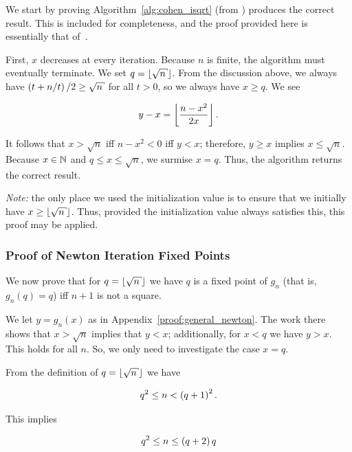 We start by proving Algorithm~\ref{alg:cohen_isqrt}
(from \cite[Algorithm 1.7.1]{cohen1993})
produces the correct result.
This is included for completeness,
and the proof provided here is essentially that
of~\cite[Algorithm 1.7.1, Proof]{cohen1993}.

First, $x$ decreases at every iteration.
Because $n$ is finite, the algorithm must eventually terminate.
We set $q = \floor{\sqrt{n}}$.
From the discussion above, we always have $\parens{t + n/t}/2 \ge \sqrt{n}$
for all $t > 0$,
so we always have $x\ge q$.
We see

\begin{equation}
    y - x = \left\lfloor \frac{n - x^{2}}{2x} \right\rfloor.
\end{equation}

\noindent
It follows that $x > \sqrt{n}$ iff $n - x^{2} < 0$ iff $y < x$;
therefore, $y\ge x$ implies $x \le \sqrt{n}$.
Because $x\in\mathbb{N}$ and $q\le x \le \sqrt{n}$, we surmise $x = q$.
Thus, the algorithm returns the correct result.

\emph{Note:} the only place we used the initialization value
is to ensure that we initially have $x \ge \floor{\sqrt{n}}$.
Thus, provided the initialization value always satisfies this,
this proof may be applied.

\subsubsection{Proof of Newton Iteration Fixed Points}
\label{proof:newton_fixed_points}

We now prove that for $q = \floor{\sqrt{n}}$ we have
$q$ is a fixed point of $g_{n}$ (that is, $g_{n}(q) = q$)
iff $n+1$ is not a square.

We let $y = g_{n}(x)$ as in Appendix~\ref{proof:general_newton}.
The work there shows that $x>\sqrt{n}$ implies that $y<x$;
additionally, for $x<q$ we have $y>x$.
This holds for all $n$.
So, we only need to investigate the case $x = q$.

From the definition of $q = \floor{\sqrt{n}}$ we have

\begin{equation}
    q^{2} \le n < \left( q+1 \right)^{2}.
\end{equation}

\noindent
This implies

\begin{equation}
    q^{2} \le n \le \left( q+2 \right)q
\end{equation}

